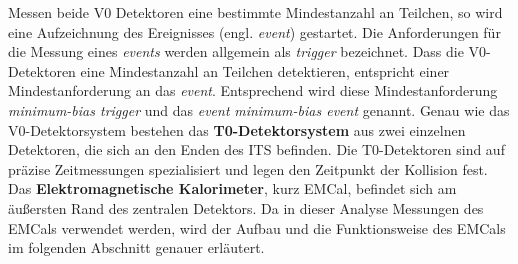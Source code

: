 Messen beide V0 Detektoren eine bestimmte Mindestanzahl an Teilchen, so wird eine Aufzeichnung des Ereignisses (engl. \textit{event}) gestartet.
Die Anforderungen für die Messung eines \textit{events} werden allgemein als \textit{trigger} bezeichnet.
Dass die V0-Detektoren eine Mindestanzahl an Teilchen detektieren, entspricht einer Mindestanforderung an das \textit{event}.
Entsprechend wird diese Mindestanforderung \textit{minimum-bias trigger} und das \textit{event} \textit{minimum-bias event} genannt.
\newline
Genau wie das V0-Detektorsystem bestehen das \textbf{T0-Detektorsystem} aus zwei einzelnen Detektoren, die sich an den Enden des ITS befinden.
Die T0-Detektoren sind auf präzise Zeitmessungen spezialisiert und legen den Zeitpunkt der Kollision fest.
\newline
Das \textbf{Elektromagnetische Kalorimeter}, kurz EMCal, befindet sich am äußersten Rand des zentralen Detektors.
Da in dieser Analyse Messungen des EMCals verwendet werden, wird der Aufbau und die Funktionsweise des EMCals im folgenden Abschnitt genauer erläutert.